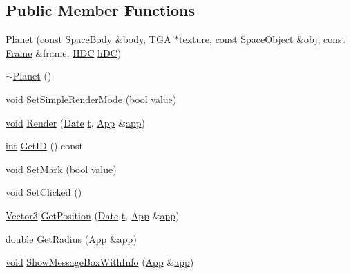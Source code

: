 \subsection*{Public Member Functions}
\begin{DoxyCompactItemize}
\item 
\hyperlink{class_planet_a02ba902d9d51b174b4c57403f1638495}{Planet} (const \hyperlink{class_space_body}{Space\+Body} \&\hyperlink{class_planet_a31ab1654dd709417ec574489f3ff9449}{body}, \hyperlink{class_t_g_a}{T\+G\+A} $\ast$\hyperlink{glext_8h_ab21590c4736d1459a5a0674a42b5a655}{texture}, const \hyperlink{class_space_object}{Space\+Object} \&\hyperlink{glext_8h_a0c0d4701a6c89f4f7f0640715d27ab26}{obj}, const \hyperlink{class_frame}{Frame} \&frame, \hyperlink{wglext_8h_aaf5a06bd464c6ec72cf68b4819afebe3}{H\+D\+C} \hyperlink{wglext_8h_a3ad0eade1f425b718bd6461c1ef31af8}{h\+D\+C})
\item 
\hyperlink{class_planet_aaa1aaed9d4ef90b4836531edb7b18e0a}{$\sim$\+Planet} ()
\item 
\hyperlink{wglext_8h_a9e6b7f1933461ef318bb000d6bd13b83}{void} \hyperlink{class_planet_a5e2be16561d2a5f687dc1928afa9a783}{Set\+Simple\+Render\+Mode} (bool \hyperlink{glext_8h_a79169be77d7e02a24f68a5bfe627dc29}{value})
\item 
\hyperlink{wglext_8h_a9e6b7f1933461ef318bb000d6bd13b83}{void} \hyperlink{class_planet_a938d62dd26e9fc747bbc9eb7ab8fa177}{Render} (\hyperlink{class_date}{Date} \hyperlink{glext_8h_a7d65d00ca3b0630d9b5c52df855b19f5}{t}, \hyperlink{class_app}{App} \&\hyperlink{_routine_8cpp_a05b5a24325d46227633053ca49de6234}{app})
\item 
\hyperlink{wglext_8h_a500a82aecba06f4550f6849b8099ca21}{int} \hyperlink{class_planet_a0675007fd8f528fb0614c224faf87d84}{Get\+I\+D} () const 
\item 
\hyperlink{wglext_8h_a9e6b7f1933461ef318bb000d6bd13b83}{void} \hyperlink{class_planet_aeaf472f68af81e148fd429e366f85150}{Set\+Mark} (bool \hyperlink{glext_8h_a79169be77d7e02a24f68a5bfe627dc29}{value})
\item 
\hyperlink{wglext_8h_a9e6b7f1933461ef318bb000d6bd13b83}{void} \hyperlink{class_planet_a83ded8fa3ef34e76649cc68fcb9af217}{Set\+Clicked} ()
\item 
\hyperlink{class_vector3}{Vector3} \hyperlink{class_planet_ae7360bf0dbe27e47a2425c09587e3461}{Get\+Position} (\hyperlink{class_date}{Date} \hyperlink{glext_8h_a7d65d00ca3b0630d9b5c52df855b19f5}{t}, \hyperlink{class_app}{App} \&\hyperlink{_routine_8cpp_a05b5a24325d46227633053ca49de6234}{app})
\item 
double \hyperlink{class_planet_ab77012071c79fec77e23f9f6e95241c5}{Get\+Radius} (\hyperlink{class_app}{App} \&\hyperlink{_routine_8cpp_a05b5a24325d46227633053ca49de6234}{app})
\item 
\hyperlink{wglext_8h_a9e6b7f1933461ef318bb000d6bd13b83}{void} \hyperlink{class_planet_aa50208f541563334226c4e6ddcd5994f}{Show\+Message\+Box\+With\+Info} (\hyperlink{class_app}{App} \&\hyperlink{_routine_8cpp_a05b5a24325d46227633053ca49de6234}{app})
\end{DoxyCompactItemize}
